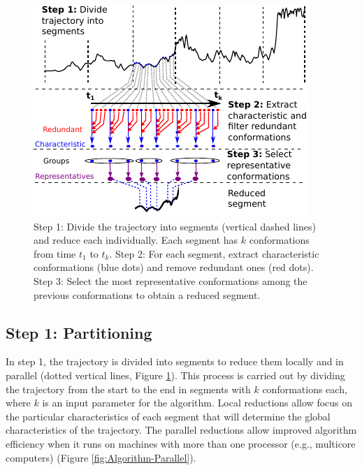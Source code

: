\documentclass[twocolumn]{bmcart}%
\begin{document}
\begin{figure}[th]
\includegraphics[scale=1.2]{images/03-algorithm-description-general}

\caption{ Step 1: Divide the trajectory into segments (vertical dashed lines) and reduce each individually. Each segment has $k$ conformations from time $t_{1}$ to $t_{k}$. Step 2: For each segment, extract characteristic conformations (blue dots) and remove redundant ones (red dots). Step 3: Select the most representative conformations among the previous conformations to obtain a reduced segment. \label{fig:Algorithm-Description}}
\end{figure}


\subsection*{Step 1: Partitioning}

In step 1, the trajectory is divided into segments to reduce them locally and in parallel (dotted vertical lines, Figure \ref{fig:Algorithm-Description}). This process is carried out by dividing the trajectory from the start to the end in segments with $k$ conformations each, where $k$ is an input parameter for the algorithm. Local reductions allow focus on the particular characteristics of each segment that will determine the global characteristics of the trajectory. The parallel reductions allow improved algorithm efficiency when it runs on machines with more than one processor (e.g., multicore computers) (Figure \ref{fig:Algorithm-Parallel}).
\end{document}
